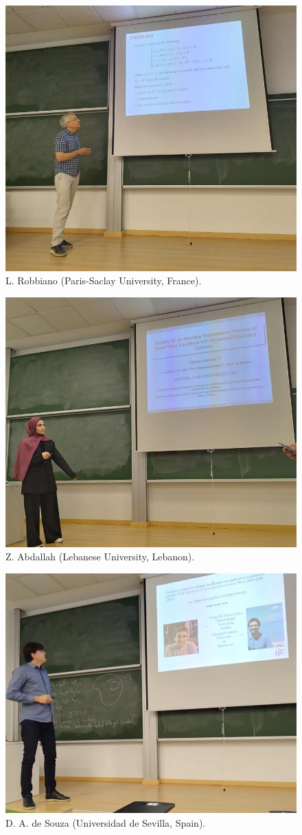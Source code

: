 \documentclass[twoside]{article}
\begin{document}
\bigskip
\begin{figure}[h!]
\centering
\includegraphics[width=0.7\linewidth]{images/Robbiano}
\caption{L. Robbiano (Paris-Saclay University, France).}
\end{figure}



\begin{figure}[h!]
\centering
\includegraphics[width=0.7\linewidth]{images/ZahraaAbdallah}
\caption{Z. Abdallah (Lebanese University, Lebanon).}
\end{figure}


\begin{figure}[h!]
\centering
\includegraphics[width=0.7\linewidth]{images/Diego}
\caption{D. A. de Souza (Universidad de Sevilla, Spain).}
\end{figure}
\end{document}
